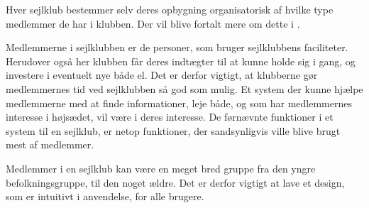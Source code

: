 Hver sejlklub bestemmer selv deres opbygning organisatorisk af hvilke type medlemmer de har i klubben.  Der vil blive
fortalt mere om dette i .  

Medlemmerne i sejlklubben er de personer, som bruger sejlklubbens faciliteter.  Herudover også her klubben får deres
indtægter til at kunne holde sig i gang, og investere i eventuelt nye både el.  Det er derfor vigtigt, at klubberne gør medlemmernes tid ved sejlklubben
så god som mulig. Et system der kunne hjælpe medlemmerne med at finde informationer, leje både, og som har
medlemmernes interesse i højsædet, vil være i deres interesse. De førnævnte funktioner i et system til
en sejlklub, er netop funktioner, der sandsynligvis ville blive brugt mest af medlemmer.

Medlemmer i en sejlklub kan være en meget bred gruppe fra den yngre befolkningsgruppe, til den noget ældre. 
Det er derfor vigtigt at lave et design, som er intuitivt i anvendelse, for alle brugere. 






